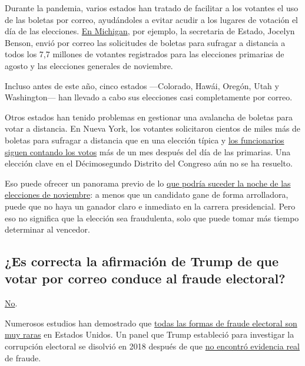 Durante la pandemia, varios estados han tratado de facilitar a los
votantes el uso de las boletas por correo, ayudándoles a evitar acudir a
los lugares de votación el día de las elecciones.
\href{https://www.nytimes.com/2020/05/20/us/politics/trump-mail-in-voting-absentee-ballots.html}{En
Michigan}, por ejemplo, la secretaria de Estado, Jocelyn Benson, envió
por correo las solicitudes de boletas para sufragar a distancia a todos
los 7,7 millones de votantes registrados para las elecciones primarias
de agosto y las elecciones generales de noviembre.

Incluso antes de este año, cinco estados ---Colorado, Hawái, Oregón,
Utah y Washington--- han llevado a cabo sus elecciones casi
completamente por correo.

Otros estados han tenido problemas en gestionar una avalancha de boletas
para votar a distancia. En Nueva York, los votantes solicitaron cientos
de miles más de boletas para sufragar a distancia que en una elección
típica y
\href{https://www.nytimes.com/2020/07/17/nyregion/election-absentee-ballots-primary.html}{los
funcionarios siguen contando los votos} más de un mes después del día de
las primarias. Una elección clave en el Décimosegundo Distrito del
Congreso aún no se ha resuelto.

Eso puede ofrecer un panorama previo de lo
\href{https://www.nytimes.com/2020/06/24/us/politics/november-2020-election-day-results.html}{que
podría suceder la noche de las elecciones de noviembre}: a menos que un
candidato gane de forma arrolladora, puede que no haya un ganador claro
e inmediato en la carrera presidencial. Pero eso no significa que la
elección sea fraudulenta, solo que puede tomar más tiempo determinar al
vencedor.

\hypertarget{es-correcta-la-afirmaciuxf3n-de-trump-de-que-votar-por-correo-conduce-al-fraude-electoral}{%
\subsection{¿Es correcta la afirmación de Trump de que votar por correo
conduce al fraude
electoral?}\label{es-correcta-la-afirmaciuxf3n-de-trump-de-que-votar-por-correo-conduce-al-fraude-electoral}}

\href{https://www.nytimes.com/article/mail-in-voting-explained.html}{No}.

Numerosos estudios han demostrado que
\href{https://www.nytimes.com/article/mail-in-voting-explained.html}{todas
las formas de fraude electoral son muy raras} en Estados Unidos. Un
panel que Trump estableció para investigar la corrupción electoral se
disolvió en 2018 después de que
\href{https://www.nytimes.com/2018/01/03/us/politics/trump-voter-fraud-commission.html}{no
encontró evidencia real} de fraude.

